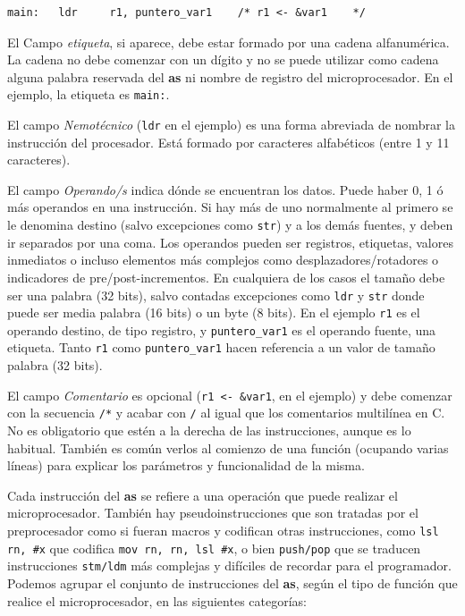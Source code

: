 \begin{lstlisting}
main:   ldr     r1, puntero_var1    /* r1 <- &var1    */
\end{lstlisting}

El Campo {\it etiqueta}, si aparece, debe estar formado por una
cadena alfanumérica. La cadena no debe comenzar con un dígito y no se puede
utilizar como cadena alguna palabra reservada del {\bf as} ni nombre
de registro del microprocesador. En el ejemplo, la etiqueta es
{\tt main:}.

El campo \textit{Nemotécnico} ({\tt ldr} en el ejemplo) es una forma
abreviada de nombrar la instrucción del procesador.
Está formado por caracteres alfabéticos (entre 1 y 11 caracteres).

El campo \textit{Operando/s} indica dónde se encuentran los datos.
Puede haber 0, 1 ó más operandos en una instrucción. Si hay más de uno
normalmente al primero se le denomina destino (salvo excepciones como {\tt str})
y a los demás fuentes, y deben ir separados por una coma.
Los operandos pueden ser registros, etiquetas, valores inmediatos o incluso
elementos más complejos como desplazadores/rotadores o indicadores de
pre/post-incrementos. En cualquiera de los casos el tamaño debe ser una
palabra (32 bits), salvo contadas excepciones como {\tt ldr} y {\tt str}
donde puede ser media palabra (16 bits) o un byte (8 bits).
En el ejemplo {\tt r1} es el operando destino, de tipo registro,
y {\tt puntero\_var1} es el operando fuente, una etiqueta. Tanto {\tt r1}
como {\tt puntero\_var1} hacen referencia a un valor de tamaño palabra (32 bits).

El campo \textit{Comentario} es opcional ({\tt r1 <- \&var1}, en el ejemplo)
y debe comenzar con la secuencia {\tt /*} y acabar con {\tt */} al igual
que los comentarios multilínea en C. No es obligatorio que estén a la
derecha de las instrucciones, aunque es lo habitual. También es común
verlos al comienzo de una función (ocupando varias líneas) para explicar
los parámetros y funcionalidad de la misma.

Cada instrucción del {\bf as} se refiere a una operación que puede
realizar el microprocesador. También hay pseudoinstrucciones que son
tratadas por el preprocesador como si fueran macros y codifican otras
instrucciones, como {\tt lsl rn, \#x} que codifica {\tt mov rn, rn, lsl \#x},
o bien {\tt push/pop} que se traducen instrucciones {\tt stm/ldm} más complejas
y difíciles de recordar para el programador. Podemos agrupar el conjunto de
instrucciones del {\bf as}, según el tipo de función que realice el
microprocesador, en las siguientes categorías:

